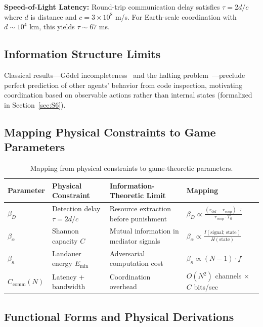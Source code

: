 \documentclass[11pt]{article}
\begin{document}
\noindent\textbf{Speed-of-Light Latency:} Round-trip communication delay satisfies $\tau = 2d/c$ where $d$ is distance and $c = 3 \times 10^8$ m/s. For Earth-scale coordination with $d \sim 10^4$ km, this yields $\tau \sim 67$ ms.

\subsection{Information Structure Limits}

Classical results---G\"odel incompleteness~\cite{godel.1931} and the halting problem~\cite{turing.1936}---preclude perfect prediction of other agents' behavior from code inspection, motivating coordination based on observable actions rather than internal states (formalized in Section~\ref{sec:S6}).

\subsection{Mapping Physical Constraints to Game Parameters}
\label{sec:S2.4}

\begin{table}[h]
\caption{Mapping from physical constraints to game-theoretic parameters.}
\label{tab:physical_mapping}
\centering
\small
\begin{tabular}{lp{3.5cm}p{3cm}p{4cm}}
\toprule
\textbf{Parameter} & \textbf{Physical Constraint} & \textbf{Information-Theoretic Limit} & \textbf{Mapping} \\
\midrule
$\beta_D$ & Detection delay $\tau = 2d/c$ & Resource extraction before punishment & $\beta_D \propto \frac{(r_{\text{def}} - r_{\text{coop}})\cdot\tau}{r_{\text{coop}}\cdot T_0}$ \\[1ex]
$\beta_\alpha$ & Shannon capacity $C$ & Mutual information in mediator signals & $\beta_\alpha \propto \frac{I(\text{signal};\, \text{state})}{H(\text{state})}$ \\[1ex]
$\beta_\kappa$ & Landauer energy $E_{\text{min}}$ & Adversarial computation cost & $\beta_\kappa \propto (N-1) \cdot f$ \\[1ex]
$C_{\text{comm}}(N)$ & Latency + bandwidth & Coordination overhead & $O(N^2)$ channels $\times$ $C$ bits/sec \\
\bottomrule
\end{tabular}
\end{table}

\subsection{Functional Forms and Physical Derivations}
\label{sec:S2.5}
\end{document}
